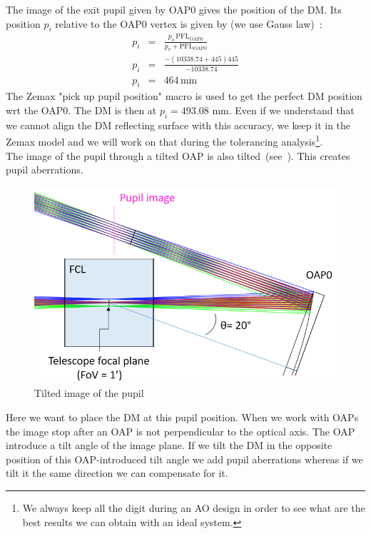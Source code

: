 \documentclass[12pt,a4paper]{article}
\begin{document}
\newpage
The image of the exit pupil given by OAP0 gives the position of the DM. Its position $p_i$ relative to the OAP0 vertex is given by (we use Gauss law)~:
\begin{eqnarray}
	p_i &= &\frac{p_o\,\text{PFL}_{\text{OAP0}}}{p_o+\text{PFL}_{\text{OAP0}}}\\
	p_i &= &\frac{-(10338.74+445)445}{-10338.74}\\
	p_i &= &464\,\text{mm}
\end{eqnarray}
The Zemax "pick up pupil position" macro is used to get the perfect DM position wrt the OAP0. The DM is then at $p_i = 493.08$ mm. Even if we understand that we cannot align the DM reflecting surface with this accuracy, we keep it in the Zemax model  and we will work on that during the tolerancing analysis\footnote{We always keep all the digit during an AO design in order to see what are the best results we can obtain with an ideal system.}. \\
The image of the pupil through a tilted OAP is also tilted~(see~\cite{cite:Design90degOAP}). This creates pupil aberrations.
\begin{figure}[H]
	\begin{center}
		\includegraphics[width=.7\linewidth]{images/DM_pupil_tilt.PNG}
		\caption{Tilted image of the pupil}\label{fig:DM_pupil_tilt}
	\end{center}
\end{figure}
Here we want to place the DM at this pupil position. When we work with OAPs the image stop after an OAP is not perpendicular to the optical axis. The OAP introduce a tilt angle of the image plane. If we tilt the DM in the opposite position of this OAP-introduced tilt angle we add pupil aberrations whereas if we tilt it the same direction we can compensate for it. 
\end{document}
